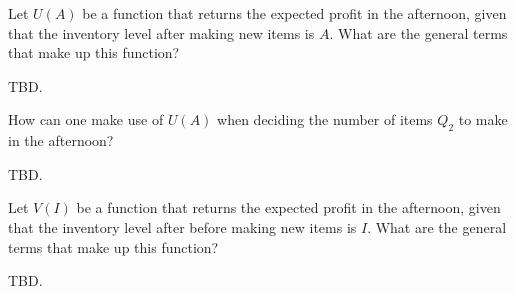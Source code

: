 \begin{question}
\begin{solution}
%
%
%
%
%
%
%
%

\end{solution}

\end{question}

\begin{question}
Let $U(A)$ be a function that returns the expected profit in the afternoon, given that the inventory level after making new items is $A$. What are the general terms that make up this function?
   \begin{solution}
     TBD.
   \end{solution}
\end{question}

\begin{question}
How can one make use of $U(A)$ when deciding the number of items $Q_2$ to make in the afternoon?
   \begin{solution}
     TBD.
   \end{solution}
\end{question}

\begin{question}
Let $V(I)$ be a function that returns the expected profit in the afternoon, given that the inventory level after before making new items is $I$. What are the general terms that make up this function?
   \begin{solution}
     TBD.
   \end{solution}
\end{question}

